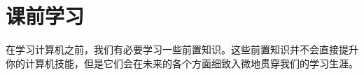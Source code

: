 \chapter{课前学习}\label{ch:Preclass}
    在学习计算机之前，我们有必要学习一些前置知识。这些前置知识并不会直接提升你的计算机技能，但是它们会在未来的各个方面细致入微地贯穿我们的学习生涯。
